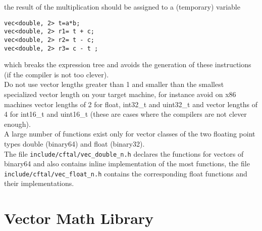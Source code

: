 \documentclass[10pt,a4paper,final,oneside]{article}
\numberwithin{equation}{subsection}
\begin{document}
the result of the multiplication should be assigned to a (temporary)
variable
\begin{lstlisting}
vec<double, 2> t=a*b;
vec<double, 2> r1= t + c;
vec<double, 2> r2= t - c;
vec<double, 2> r3= c - t ;
\end{lstlisting}
which breaks the expression tree and avoids the generation of these
instructions (if the compiler is not too clever).\\[10pt]
%
Do not use vector lengths greater than 1 and smaller than the smallest
specialized vector length on your target machine, for instance avoid on
x86 machines vector lengths of 2 for float, int32\_t and uint32\_t and
vector lengths of 4 for int16\_t and uint16\_t
(these are cases where the compilers are not clever enough).\\[10pt]
%
A large number of functions exist only for vector classes of the
two floating point types double (binary64) and float (binary32).\\
The file \texttt{include/cftal/vec\_double\_n.h} declares the functions
for vectors of binary64 and also contains inline implementation of
the most functions, the file \texttt{include/cftal/vec\_float\_n.h} contains
the corresponding float functions and their implementations.

\section{Vector Math Library}
\label{sec:vec_math_lib}
\end{document}
